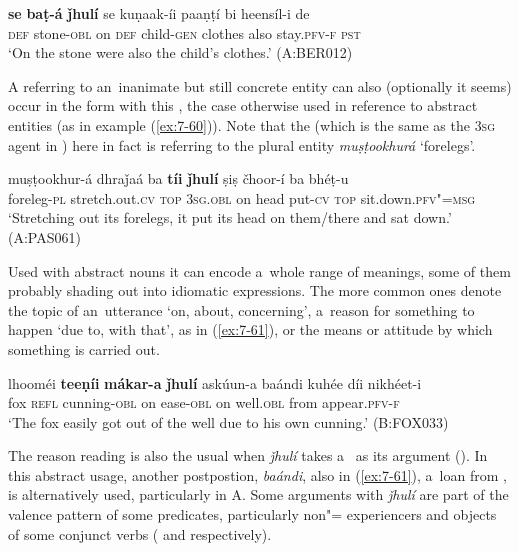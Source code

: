 \begin{exe}
\ex
\label{ex:7-59}
\gll \textbf{se} \textbf{baṭ-á} \textbf{ǰhulí} se kuṇaak-íi paaṇṭí bi heensíl-i de \\
\textsc{def} stone-\textsc{obl} on \textsc{def}  child-\textsc{gen}  clothes also  stay.\textsc{pfv-f} \textsc{pst } \\
\glt `On the stone were also the child's clothes.' (A:BER012)
\end{exe}


A  referring to an~inanimate but still concrete entity can also (optionally it seems) occur in the  form with this , the case otherwise used in  reference to abstract entities (as in example (\ref{ex:7-60})). Note that the   (which is the same as the \textsc{3sg} agent in ) here in fact is referring to the plural entity \textit{muṣṭookhurá} `forelegs'.

\ea
\ex
\label{ex:7-60}
\gll muṣṭookhur-á dhraǰaá ba \textbf{tíi} \textbf{ǰhulí} ṣiṣ čhoor-í ba bhéṭ-u\\
foreleg-\textsc{pl} stretch.out.\textsc{cv} \textsc{top} \textsc{3sg.obl} on head put-\textsc{cv} \textsc{top} sit.down.\textsc{pfv"=msg}\\
\glt `Stretching out its forelegs, it put its head on them/there and sat down.' (A:PAS061)
\z

Used with abstract nouns it can encode a~whole range of meanings, some of them probably shading out into idiomatic expressions. The more common ones denote the topic of an~utterance `on, about, concerning', a~reason for something to happen `due to, with that', as in (\ref{ex:7-61}), or the means or attitude by which something is carried out.

\ea
\label{ex:7-61}
\gll lhooméi \textbf{teeṇíi} \textbf{mákar-a} \textbf{ǰhulí} askúun-a baándi kuhée díi nikhéet-i\\
fox \textsc{refl} cunning-\textsc{obl} on ease-\textsc{obl} on well.\textsc{obl} from appear.\textsc{pfv-f}\\
\glt `The fox easily got out of the well due to his own cunning.' (B:FOX033)
\z

The reason reading is also the usual when \textit{ǰhulí} takes a~ as its argument (). In this abstract usage, another postpostion, \textit{baándi}, also in (\ref{ex:7-61}), a~loan from \iliPashto, is alternatively used, particularly in A. Some arguments with \textit{ǰhulí} are part of the valence pattern of some predicates, particularly non"= experiencers and objects of some conjunct verbs ( and  respectively).


